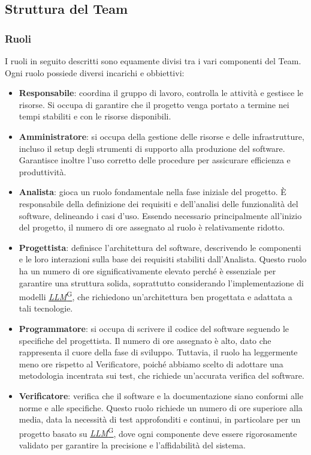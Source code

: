 \documentclass{article}
\begin{document}
    \subsection{Struttura del Team}
        \subsubsection{Ruoli}
        I ruoli in seguito descritti sono equamente divisi tra i vari componenti del Team. Ogni ruolo possiede diversi incarichi e obbiettivi:
        \begin{itemize}
            \item \textbf{Responsabile}: coordina il gruppo di lavoro, controlla le attività e gestisce le risorse. Si occupa di garantire che il progetto venga portato a termine nei tempi stabiliti e con le risorse disponibili.
            \item \textbf{Amministratore}: si occupa della gestione delle risorse e delle infrastrutture, incluso il setup degli strumenti di supporto alla produzione del software. Garantisce inoltre l’uso corretto delle procedure per assicurare efficienza e produttività.
            \item \textbf{Analista}: gioca un ruolo fondamentale nella fase iniziale del progetto. È responsabile della definizione dei requisiti e dell’analisi delle funzionalità del software, delineando i casi d'uso. Essendo necessario principalmente all'inizio del progetto, il numero di ore assegnato al ruolo è relativamente ridotto.
            \item \textbf{Progettista}: definisce l'architettura del software, descrivendo le componenti e le loro interazioni sulla base dei requisiti stabiliti dall'Analista. Questo ruolo ha un numero di ore significativamente elevato perché è essenziale per garantire una struttura solida, soprattutto considerando l’implementazione di modelli \href{https://code7crusaders.github.io/docs/PB/documentazione_interna/glossario.html#llm-large-language-model}{\emph{LLM}\textsuperscript{G}}, che richiedono un'architettura ben progettata e adattata a tali tecnologie.
            \item \textbf{Programmatore}: si occupa di scrivere il codice del software seguendo le specifiche del progettista. Il numero di ore assegnato è alto, dato che rappresenta il cuore della fase di sviluppo. Tuttavia, il ruolo ha leggermente meno ore rispetto al Verificatore, poiché abbiamo scelto di adottare una metodologia incentrata sui test, che richiede un’accurata verifica del software.
            \item \textbf{Verificatore}: verifica che il software e la documentazione siano conformi alle norme e alle specifiche. Questo ruolo richiede un numero di ore superiore alla media, data la necessità di test approfonditi e continui, in particolare per un progetto basato su \href{https://code7crusaders.github.io/docs/PB/documentazione_interna/glossario.html#llm-large-language-model}{\emph{LLM}\textsuperscript{G}}, dove ogni componente deve essere rigorosamente validato per garantire la precisione e l’affidabilità del sistema.
        \end{itemize}
\end{document}

